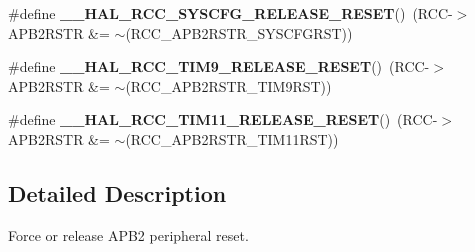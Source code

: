 \begin{DoxyCompactItemize}
\#define {\bfseries \+\_\+\+\_\+\+H\+A\+L\+\_\+\+R\+C\+C\+\_\+\+S\+Y\+S\+C\+F\+G\+\_\+\+R\+E\+L\+E\+A\+S\+E\+\_\+\+R\+E\+S\+ET}()~(R\+CC-\/$>$A\+P\+B2\+R\+S\+TR \&= $\sim$(R\+C\+C\+\_\+\+A\+P\+B2\+R\+S\+T\+R\+\_\+\+S\+Y\+S\+C\+F\+G\+R\+ST))
\item 
\mbox{\label{group___r_c_c___a_p_b2___force___release___reset_ga71fee37e3aff2c5040e2e9f4e153f4ff}} 
\#define {\bfseries \+\_\+\+\_\+\+H\+A\+L\+\_\+\+R\+C\+C\+\_\+\+T\+I\+M9\+\_\+\+R\+E\+L\+E\+A\+S\+E\+\_\+\+R\+E\+S\+ET}()~(R\+CC-\/$>$A\+P\+B2\+R\+S\+TR \&= $\sim$(R\+C\+C\+\_\+\+A\+P\+B2\+R\+S\+T\+R\+\_\+\+T\+I\+M9\+R\+ST))
\item 
\mbox{\label{group___r_c_c___a_p_b2___force___release___reset_gab66378d2b26c2c47522f268e129b6709}} 
\#define {\bfseries \+\_\+\+\_\+\+H\+A\+L\+\_\+\+R\+C\+C\+\_\+\+T\+I\+M11\+\_\+\+R\+E\+L\+E\+A\+S\+E\+\_\+\+R\+E\+S\+ET}()~(R\+CC-\/$>$A\+P\+B2\+R\+S\+TR \&= $\sim$(R\+C\+C\+\_\+\+A\+P\+B2\+R\+S\+T\+R\+\_\+\+T\+I\+M11\+R\+ST))
\end{DoxyCompactItemize}


\subsection{Detailed Description}
Force or release A\+P\+B2 peripheral reset. 

